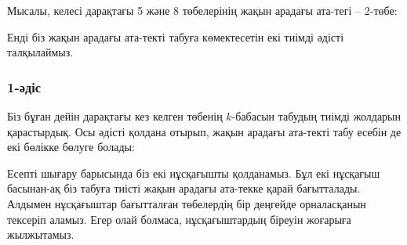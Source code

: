 Мысалы, келесі дарақтағы 5 және 8 төбелерінің 
жақын арадағы ата-тегі -- 2-төбе:
\begin{center}
\end{center}

Енді біз жақын арадағы ата-текті табуға көмектесетін
екі тиімді әдісті талқылаймыз.

\subsubsection{1-әдіс}

Біз бұған дейін дарақтағы кез келген төбенің 
$k$-бабасын табудың тиімді жолдарын қарастырдық. 
Осы әдісті қолдана отырып, жақын арадағы ата-текті табу
есебін де екі бөлікке бөлуге болады:

Есепті шығару барысында біз  екі нұсқағышты қолданамыз. Бұл екі нұсқағыш басынан-ақ біз табуға тиісті  
жақын арадағы ата-текке қарай бағытталады.
Алдымен нұсқағыштар бағытталған төбелердің бір деңгейде орналасқанын тексеріп аламыз. 
Егер олай болмаса, нұсқағыштардың біреуін жоғарыға жылжытамыз.

